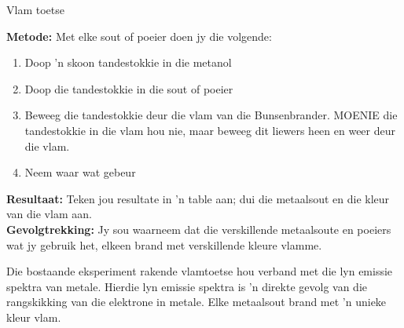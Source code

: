 \begin{i_experiment}{Vlam toetse}
{\label{m38741*eip-6992}\noindent{}\textbf{Metode:}\newline
Met elke sout of poeier doen jy die volgende: \label{m38741*id7092}\begin{enumerate}[noitemsep, label=\textbf{\arabic*}. ] 
            \item Doop  'n skoon tandestokkie in die metanol 
\item Doop die tandestokkie in die sout of poeier
\item Beweeg die tandestokkie deur die vlam van die Bunsenbrander. MOENIE die tandestokkie in die vlam hou nie,
maar beweeg dit liewers heen en weer deur die vlam.
\item Neem waar wat gebeur
\end{enumerate}
\label{m38741*eip-6993}\noindent{}\textbf{Resultaat:}\newline
Teken jou resultate in  'n table aan; dui die metaalsout en die kleur van die vlam aan.
\\ 
\label{m38741*eip-6994}\noindent{}\textbf{Gevolgtrekking:}\newline
Jy sou waarneem dat die verskillende metaalsoute en poeiers wat jy gebruik het, elkeen brand met verskillende kleure vlamme.}
\end{i_experiment}
Die bostaande eksperiment rakende vlamtoetse hou verband met die lyn emissie spektra van metale. Hierdie lyn emissie spektra is  'n direkte gevolg van die rangskikking van die elektrone in metale. Elke metaalsout brand met  'n unieke kleur vlam. \par \label{m38741*secfhsst!!!underscore!!!id766}

